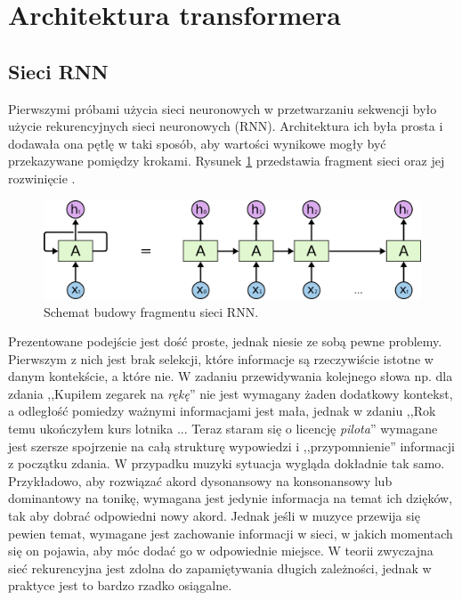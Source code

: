 \documentclass[data-science]{agh-wi} %
\begin{document}
\section{Architektura transformera}
\subsection{Sieci RNN}
Pierwszymi próbami użycia sieci neuronowych w przetwarzaniu sekwencji było użycie rekurencyjnych sieci neuronowych (RNN). Architektura ich była prosta i dodawała ona pętlę w taki sposób, aby wartości wynikowe mogły być przekazywane pomiędzy krokami. Rysunek \ref*{fig:rnn_scheme} przedstawia fragment sieci oraz jej rozwinięcie \cite{Understanding_lstm}.
\begin{figure}[ht!]
    \begin{center}
        \includegraphics[width=0.7\linewidth]{./img/rnn_scheme.png}
    \end{center}
    \caption{Schemat budowy fragmentu sieci RNN.}\label{fig:rnn_scheme}
\end{figure}

Prezentowane podejście jest dość proste, jednak niesie ze sobą pewne problemy. Pierwszym z nich jest brak selekcji, które informacje są rzeczywiście istotne w danym kontekście, a które nie. W zadaniu przewidywania kolejnego słowa np. dla zdania ,,Kupiłem zegarek na \textit{rękę}'' nie jest wymagany żaden dodatkowy kontekst, a odległość pomiedzy ważnymi informacjami jest mała, jednak w zdaniu ,,Rok temu ukończyłem kurs lotnika ... Teraz staram się o licencję \textit{pilota}'' wymagane jest szersze spojrzenie na całą strukturę wypowiedzi i ,,przypomnienie'' informacji z początku zdania. W przypadku muzyki sytuacja wygląda dokładnie tak samo. Przykładowo, aby rozwiązać akord dysonansowy na konsonansowy lub dominantowy na tonikę, wymagana jest jedynie informacja na temat ich dzięków, tak aby dobrać odpowiedni nowy akord. Jednak jeśli w muzyce przewija się pewien temat, wymagane jest zachowanie informacji w sieci, w jakich momentach się on pojawia, aby móc dodać go w odpowiednie miejsce. W teorii zwyczajna sieć rekurencyjna jest zdolna do zapamiętywania długich zależności, jednak w praktyce jest to bardzo rzadko osiągalne.
\end{document}
